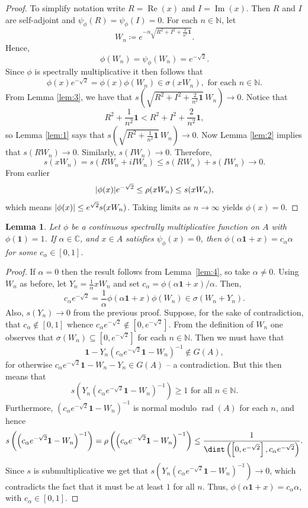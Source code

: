 \documentclass{amsart}
\newtheorem{lemma}[theorem]{Lemma}
\theoremstyle{definition}
\theoremstyle{remark}
\DeclareMathOperator{\rad}{rad} \DeclareMathOperator{\G}{G}
\newcommand{\identity}{\mathbf{1}}
\DeclareMathOperator{\Ima}{Im}
\DeclareMathOperator{\Rea}{Re}
\DeclarePairedDelimiter\abs{\lvert}{\rvert}
\newcommand{\field}{\mathbb{C}}
\begin{document}
 	\begin{proof}
 		To simplify notation write $R=\Rea(x)$ and $I=\Ima(x)$. Then $R$ and $I$ are self-adjoint and $\psi_\phi(R)=\psi_\phi (I)=0$. For each $n\in\mathbb{N}$, let $$W_n \coloneqq e^{-n\sqrt{R^2+I^2+\frac{2}{n^2}\mathbf 1}}.$$ Hence, 
 		$$\phi (W_n)=\psi_\phi(W_n)= e^{-\sqrt2}.$$
 		Since $\phi$ is spectrally multiplicative it then follows that 
 		$$\phi(x)e^{-\sqrt2}=\phi(x)\phi(W_n)\in \sigma(xW_n), \text{ for each } n\in\mathbb{N}.$$
 		From Lemma \ref{lem:3}, we have that $s\left(\sqrt{R^2+I^2+\frac{2}{n^2}\mathbf 1}\,W_n\right)\to 0$. Notice that $${R^2+\frac{1}{n^2}\mathbf 1}<{R^2+I^2+\frac{2}{n^2}\mathbf 1},$$ so Lemma \ref{lem:1} says that $s\left(\sqrt{R^2+\frac{1}{n^2}\mathbf 1}\,W_n\right)\to 0$. Now Lemma \ref{lem:2} implies that $s(RW_n)\to 0$. Similarly, $s(IW_n)\to 0$. Therefore,
 		$$s(xW_n) = s(RW_n+iIW_n)\leq s(RW_n)+s(IW_n)\to 0.$$
 		From earlier
 		$${\abs{\phi(x)}}e^{-\sqrt2}\leq \rho(xW_n)\leq s(xW_n),$$
 		which means $\abs{\phi(x)}\leq e^{\sqrt 2}s(xW_n)$. Taking limits as $n\to\infty $ yields $\phi(x)=0$.
 	\end{proof}
 	
 	\begin{lemma}\label{lem:5}
 		Let $\phi$ be a continuous spectrally multiplicative function on $A$ with $\phi(\identity)=1$. If $\alpha\in\field$, and $x\in A$ satisfies $\psi_\phi(x)=0$, then $\phi(\alpha\identity+x)=c_\alpha \alpha$ for some $c_\alpha\in [0,1]$.
 	\end{lemma}
 	\begin{proof}
 		If $\alpha=0$ then the result follows from Lemma~\ref{lem:4}, so take $\alpha\neq 0$. Using $W_n$ as before, let $Y_n=\frac{1}{\alpha} xW_n$ and set $c_\alpha = \phi(\alpha\identity+x)/\alpha$. Then, 
 		$${c_\alpha}{e^{-\sqrt2}}=\frac{1}{\alpha}\phi(\alpha\identity+x)\phi(W_n)\in \sigma(W_n+Y_n).$$
 		Also, $s(Y_n)\to 0$ from the previous proof. Suppose, for the sake of contradiction, that $c_\alpha \not \in [0,1]$ whence $c_\alpha e^{-\sqrt2}\not\in \left[0,e^{-\sqrt2}\right]$. From the definition of $W_n$ one observes that $\sigma(W_n)\subseteq [0,e^{-\sqrt2}]$ for each $n\in\mathbb{N}$. Then we must have that 
 		$$\identity-Y_n\left(c_\alpha e^{-\sqrt2}\identity-W_n\right)^{-1}\not\in G(A),$$
 		for otherwise $c_\alpha e^{-\sqrt2}\identity-W_n-Y_n \in G(A)$ -- a contradiction. But this then means that $$s\left(Y_n\left(c_\alpha e^{-\sqrt2}\identity-W_n \right)^{-1}\right)\geq 1 \mbox{ for all } n\in\mathbb N.$$ Furthermore, $\left(c_\alpha e^{-\sqrt2}\identity-W_n \right)^{-1} $ is normal modulo $\rad(A)$ for each $n$, and hence 
 		$$s\left(\left(c_\alpha e^{-\sqrt2}\identity-W_n \right)^{-1}\right)=\rho\left(\left(c_\alpha e^{-\sqrt2}\identity-W_n\right)^{-1}\right)\leq \frac{1}{\dist\left(\left[0, e^{-\sqrt2}\right], c_\alpha e^{-\sqrt2}\right)}.$$
 		Since $s$ is submultiplicative we get that $s\left(Y_n\left(c_\alpha e^{-\sqrt2}\identity-W_n \right)^{-1}\right)\to 0$, which contradicts the fact that it must be at least $1$ for all $n$. Thus, $\phi(\alpha\identity+x)=c_\alpha\alpha$, with $c_\alpha\in [0,1]$.
  	\end{proof}
  	
\end{document}

